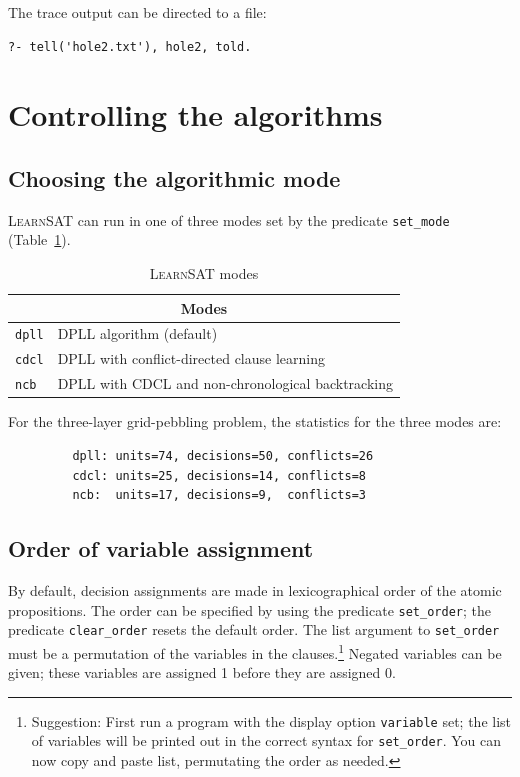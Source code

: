 \documentclass[11pt]{report}
\newcommand*{\p}[1]{\textup{\texttt{#1}}}
\newcommand*{\ls}{\textsc{LearnSAT}}
\begin{document}
The trace output can be directed to a file:

\begin{verbatim}
?- tell('hole2.txt'), hole2, told.
\end{verbatim}

\newpage

\section{Controlling the algorithms}

\subsection{Choosing the algorithmic mode}

\ls{} can run in one of three modes set by the predicate \p{set\_mode}
(Table~\ref{tab.modes}).

\begin{table}[*hb]
\begin{center}
\begin{tabular}{|l|l|}
\hline
\multicolumn{2}{|c|}{\textbf{\large Modes}}\\
\hline
\p{dpll} & DPLL algorithm (default)\\
\p{cdcl} & DPLL with conflict-directed clause learning\\
\p{ncb} &  DPLL with CDCL and non-chronological backtracking\\
\hline
\end{tabular}
\caption{\ls{} modes}\label{tab.modes}
\end{center}
\end{table}


For the three-layer grid-pebbling problem, the statistics for the three
modes are:
\begin{verbatim}
         dpll: units=74, decisions=50, conflicts=26
         cdcl: units=25, decisions=14, conflicts=8
         ncb:  units=17, decisions=9,  conflicts=3
\end{verbatim}

\subsection{Order of variable assignment}

By default, decision assignments are made in lexicographical order of
the atomic propositions. The order can be specified by using the
predicate \p{set\_order}; the predicate \p{clear\_order} resets the
default order. The list argument to \p{set\_order} must be a permutation
of the variables in the clauses.\footnote{Suggestion: First run a
program with the display option \p{variable} set; the list of variables
will be printed out in the correct syntax for \p{set\_order}. You can
now copy and paste list, permutating the order as needed.} Negated
variables can be given; these variables are assigned 1 before they are
assigned 0.
\end{document}
